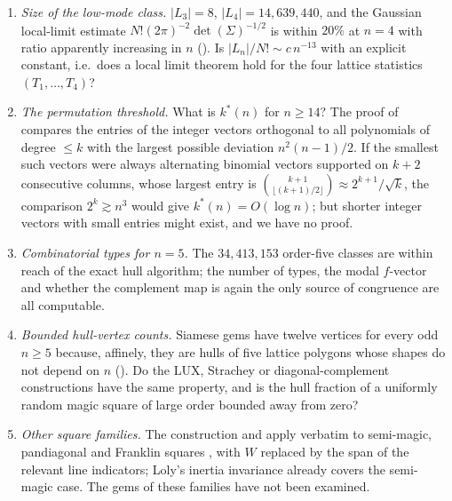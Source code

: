 \begin{enumerate}\setlength\itemsep{1pt}
\item \emph{Size of the low-mode class.} $|L_3|=8$, $|L_4|=14{,}639{,}440$, and the Gaussian local-limit estimate $N!(2\pi)^{-2}\det(\Sigma)^{-1/2}$ is within $20\%$ at $n=4$ with ratio apparently increasing in $n$ (). Is $|L_n|/N!\sim c\,n^{-13}$ with an explicit constant, i.e.\ does a local limit theorem hold for the four lattice statistics $(T_1,\dots,T_4)$?
\item \emph{The permutation threshold.} What is $k^*(n)$ for $n\ge14$? The proof of  compares the entries of the integer vectors orthogonal to all polynomials of degree $\le k$ with the largest possible deviation $n^2(n-1)/2$. If the smallest such vectors were always alternating binomial vectors supported on $k+2$ consecutive columns, whose largest entry is $\binom{k+1}{\lfloor(k+1)/2\rfloor}\approx2^{k+1}/\sqrt k$, the comparison $2^k\gtrsim n^3$ would give $k^*(n)=O(\log n)$; but shorter integer vectors with small entries might exist, and we have no proof.
\item \emph{Combinatorial types for $n=5$.} The $34{,}413{,}153$ order-five classes are within reach of the exact hull algorithm; the number of types, the modal $f$-vector and whether the complement map is again the only source of congruence are all computable.
\item \emph{Bounded hull-vertex counts.} Siamese gems have twelve vertices for every odd $n\ge5$ because, affinely, they are hulls of five lattice polygons whose shapes do not depend on $n$ (). Do the LUX, Strachey or diagonal-complement constructions have the same property, and is the hull fraction of a uniformly random magic square of large order bounded away from zero?
\item \emph{Other square families.} The construction and  apply verbatim to semi-magic, pandiagonal and Franklin squares \cite{loly2007franklin}, with $W$ replaced by the span of the relevant line indicators; Loly's inertia invariance already covers the semi-magic case. The gems of these families have not been examined.
\end{enumerate}
